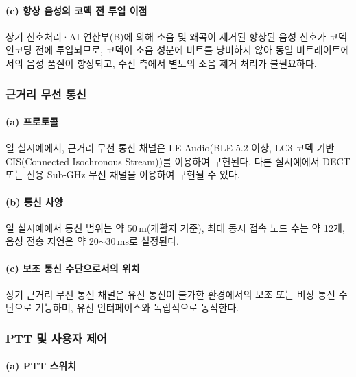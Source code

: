 \documentclass{article}
\begin{document}
\paragraph{(c) 향상 음성의 코덱 전 투입 이점}

상기 신호처리·AI 연산부(B)에 의해 소음 및 왜곡이 제거된 향상된 음성 신호가 코덱 인코딩 전에 투입되므로, 코덱이 소음 성분에 비트를 낭비하지 않아 동일 비트레이트에서의 음성 품질이 향상되고, 수신 측에서 별도의 소음 제거 처리가 불필요하다.

\subsubsection{근거리 무선 통신}

\paragraph{(a) 프로토콜}

일 실시예에서, 근거리 무선 통신 채널은 LE Audio(BLE 5.2 이상, LC3 코덱 기반 CIS(Connected Isochronous Stream))를 이용하여 구현된다. 다른 실시예에서 DECT 또는 전용 Sub-GHz 무선 채널을 이용하여 구현될 수 있다.

\paragraph{(b) 통신 사양}

일 실시예에서 통신 범위는 약 50\,m(개활지 기준), 최대 동시 접속 노드 수는 약 12개, 음성 전송 지연은 약 20$\sim$30\,ms로 설정된다.

\paragraph{(c) 보조 통신 수단으로서의 위치}

상기 근거리 무선 통신 채널은 유선 통신이 불가한 환경에서의 보조 또는 비상 통신 수단으로 기능하며, 유선 인터페이스와 독립적으로 동작한다.

\subsubsection{PTT 및 사용자 제어}

\paragraph{(a) PTT 스위치}
\end{document}
